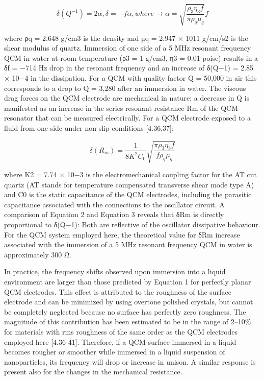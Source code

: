 \begin{equation}
\delta (Q^{-1})=2\alpha,  \delta = -\mathit{f}\alpha , where\rightarrow \alpha= \sqrt{\frac{\rho_{3}\eta _{3}\mathit{f}}{\pi\rho_{q}\mu _{q}}}\mathit{f}
\label{ch5:eq1}
\end{equation} 

where ρq = 2.648 g/cm3 is the density and µq =
2.947 × 1011 g/cm/s2 is the shear modulus of quartz. Immersion of one side of a 5 MHz resonant frequency QCM in water at room temperature (ρ3 = 1 g/cm3, η3 = 0.01 poise) results in a δf = −714 Hz drop in the resonant frequency and an increase of δ(Q−1) = 2.85 × 10−4 in the dissipation. For a QCM with quality factor Q = 50,000 in air this corresponds to a drop to Q = 3,280 after an immersion in water.
The viscous drag forces on the QCM electrode are mechanical in nature; a decrease in Q is manifested as an increase in the series resonant resistance Rm of the QCM resonator that can be measured electrically. For a QCM electrode exposed to a fluid from one side under non-slip conditions [4.36,37]:

\begin{equation}
\delta (R_{m})=\frac{1}{8\mathit{K^{2}C_{0}}} \sqrt{\frac{\pi\rho_{3}\eta _{3}\mathit{f}}{\mathit{f}\rho_{q}\mu _{q}}}
\label{ch5:eq2}
\end{equation} 

where K2 = 7.74 × 10−3 is the electromechanical coupling factor for the AT cut quartz (AT stands for temperature compensated transverse shear mode type A) and C0 is the static capacitance of the QCM electrodes, including the parasitic capacitance associated with the connections to the oscillator circuit. A comparison of Equation 2 and Equation 3 reveals that δRm is directly proportional to δ(Q−1): Both are reflective of the oscillator dissipative behaviour. For the QCM system employed here, the theoretical value for δRm increase associated with the immersion of a 5 MHz resonant frequency QCM in water is approximately 300 Ω.

In practice, the frequency shifts observed upon immersion into a liquid environment are larger than those predicted by Equation 1 for perfectly planar QCM electrodes. This effect is attributed to the roughness of the surface electrode and can be minimized by using overtone polished crystals, but cannot be completely neglected because no surface has perfectly zero roughness. The magnitude of this contribution has been estimated to be in the range of 2–10\% for materials with rms roughness of the same order as the QCM electrodes employed here [4.36-41]. Therefore, if a QCM surface immersed in a liquid becomes rougher or smoother while immersed in a liquid suspension of nanoparticles, its frequency will drop or increase in unison. A similar response is present also for the changes in the mechanical resistance.

